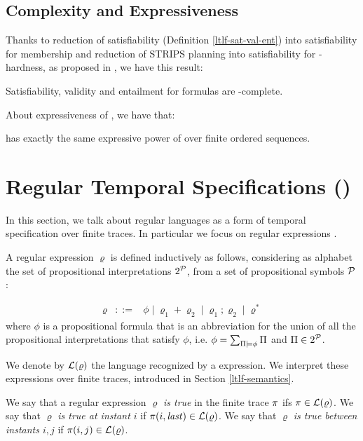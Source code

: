 \subsection{Complexity and Expressiveness}
Thanks to reduction of \LTLf satisfiability (Definition \ref{ltlf-sat-val-ent}) into \LTL satisfiability for \PSPACE membership and reduction of STRIPS planning into \LTLf satisfiability for \PSPACE-hardness, as proposed in \citep{de2013linear}, we have this result:
\begin{theorem}
	Satisfiability, validity and entailment for \LTLf formulas are \PSPACE-complete.
\end{theorem}

About expressiveness of \LTLf, we have that:
\begin{theorem}
	\LTLf has exactly the same expressive power of \FOL over finite ordered sequences.
\end{theorem}

\section{Regular Temporal Specifications (\RE)}
In this section, we talk about regular languages as a form of temporal specification over finite traces. In particular we focus on regular expressions \citep{Hopcroft:2000:IAT:557657}.

A regular expression $\varrho$ is defined inductively as follows, considering as alphabet the set of propositional interpretations $2^{\mathcal{P}}$, from a set of propositional symbols $\mathcal{P}$:

\[\begin{array}{rcl}
\varrho &::=& \phi \mid \varrho_1 + \varrho_2 \mid \varrho_1 ; \varrho_2 \mid \varrho^*
\end{array}
\]
where $\phi$ is a propositional formula that is an abbreviation for the union of all the propositional interpretations that satisfy $\phi$, i.e. $\phi = \sum_{\Pi\models \phi} \Pi$ and $\Pi\in 2^{\mathcal{P}}$.

We denote by $\mathcal{L}(\varrho)$ the language recognized by a \RE expression. We interpret these expressions over finite traces, introduced in Section \ref{ltlf-semantics}.
\begin{definition}
	We say that a regular expression $\varrho$ \emph{is true} in the finite trace $\pi$ ifs $\pi \in \mathcal{L}(\varrho)$. We say that $\varrho$ \emph{is true at instant $i$} if $\pi(i, \mathit{last})\in \mathcal{L}(\varrho)$. We say that $\varrho$ \emph{is true between instants $i, j$} if $\pi(i, j) \in \mathcal{L}(\varrho)$.
\end{definition}

